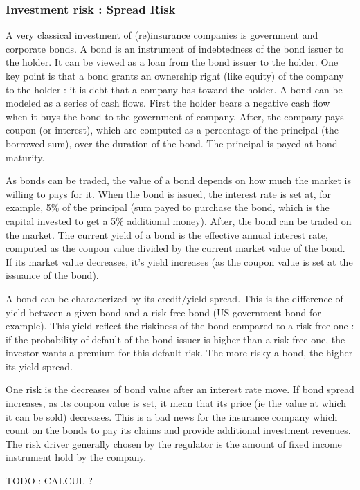 \subsubsection{Investment risk : Spread Risk}

A very classical investment of (re)insurance companies is government and corporate bonds. A bond is an instrument of indebtedness of the bond issuer to the holder. It can be viewed as a loan from the bond issuer to the holder. One key point is that a bond grants an ownership right (like equity) of the company to the holder : it is debt that a company has toward the holder. A bond can be modeled as a series of cash flows. First the holder bears a negative cash flow when it buys the bond to the government of company. After, the company pays coupon (or interest), which are computed as a percentage of the principal (the borrowed sum), over the duration of the bond. The principal is payed at bond maturity.

As bonds can be traded, the value of a bond depends on how much the market is willing to pays for it. When the bond is issued, the interest rate is set at, for example, 5\% of the principal (sum payed to purchase the bond, which is the capital invested to get a 5\% additional money). After, the bond can be traded on the market. The current yield of a bond is the effective annual interest rate, computed as the coupon value divided by the current market value of the bond. If its market value decreases, it's yield increases (as the coupon value is set at the issuance of the bond).

A bond can be characterized by its credit/yield spread. This is the difference of yield between a given bond and a risk-free bond (US government bond for example). This yield reflect the riskiness of the bond compared to a risk-free one : if the probability of default of the bond issuer is higher than a risk free one, the investor wants a premium for this default risk. The more risky a bond, the higher its yield spread. 

One risk is the decreases of bond value after an interest rate move. If bond spread increases, as its coupon value is set, it mean that its price (ie the value at which it can be sold) decreases. This is a bad news for the insurance company which count on the bonds to pay its claims and provide additional investment revenues. The risk driver generally chosen by the regulator is the amount of fixed income instrument hold by the company.

TODO : CALCUL ?

